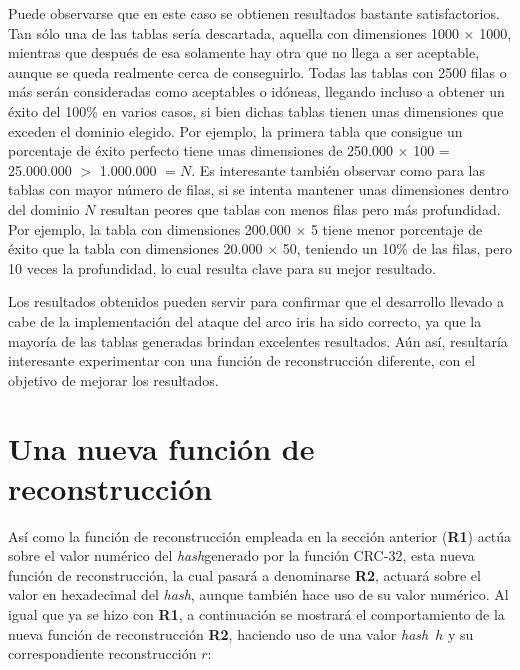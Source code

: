 \documentclass[12pt,spanish,listoffigures,listoftables,listofalgorithms]{tfgetsinf}
\newcommand{\hash}{\textit{hash}}
\begin{document}
Puede observarse que en este caso se obtienen resultados bastante satisfactorios. Tan sólo una de las tablas sería descartada, aquella con dimensiones 1000 $\times$ 1000, mientras que después de esa solamente hay otra que no llega a ser aceptable, aunque se queda realmente cerca de conseguirlo. Todas las tablas con 2500 filas o más serán consideradas como aceptables o idóneas, llegando incluso a obtener un éxito del 100\% en varios casos, si bien dichas tablas tienen unas dimensiones que exceden el dominio elegido. Por ejemplo, la primera tabla que consigue un porcentaje de éxito perfecto tiene unas dimensiones de 250.000 $\times$ 100 = 25.000.000 $>$ 1.000.000 $= N$. Es interesante también observar como para las tablas con mayor número de filas, si se intenta mantener unas dimensiones dentro del dominio $N$ resultan peores que tablas con menos filas pero más profundidad. Por ejemplo, la tabla con dimensiones 200.000 $\times$ 5 tiene menor porcentaje de éxito que la tabla con dimensiones 20.000 $\times$ 50, teniendo un 10\% de las filas, pero 10 veces la profundidad, lo cual resulta clave para su mejor resultado.

Los resultados obtenidos pueden servir para confirmar que el desarrollo llevado a cabe de la implementación del ataque del arco iris ha sido correcto, ya que la mayoría de las tablas generadas brindan excelentes resultados. Aún así, resultaría interesante experimentar con una función de reconstrucción diferente, con el objetivo de mejorar los resultados.

\section{Una nueva función de reconstrucción}

Así como la función de reconstrucción empleada en la sección anterior (\textbf{R1}) actúa sobre el valor numérico del \hash generado por la función CRC-32, esta nueva función de reconstrucción, la cual pasará a denominarse \textbf{R2}, actuará sobre el valor en hexadecimal del \hash, aunque también hace uso de su valor numérico. Al igual que ya se hizo con \textbf{R1}, a continuación se mostrará el comportamiento de la nueva función de reconstrucción \textbf{R2}, haciendo uso de una valor \hash~$h$ y su correspondiente reconstrucción $r$:
\end{document}
